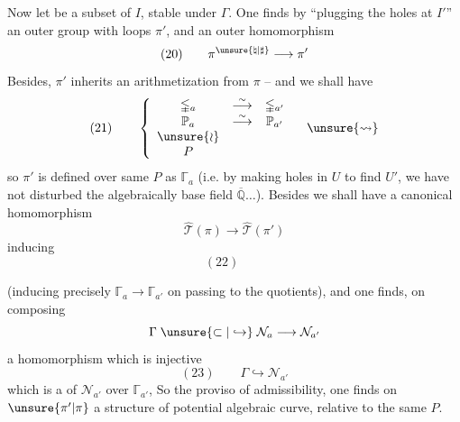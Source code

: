 Now let
be a
subset of $I$, stable under $\Gamma$. One finds
by ``plugging the holes at $I'$'' an
outer group with loops $\pi'$,  and an
outer homomorphism
\[
(20)\qquad \pi^{\unsure{\natural|\sharp}}\longrightarrow\pi'
\]
Besides, $\pi'$ inherits an arithmetization 
from $\pi$ -- and we shall have
\[
(21)\qquad
\left\{
\begin{array}{ccc}
\mathbb{\Gamma}_a & \overset{\sim}{\longrightarrow} & \mathbb{\Gamma}_{a'} \\
\mathbb P_a & \overset{\sim}{\longrightarrow} & \mathbb P_{a'} \\
\unsure{\wr} & & \\
P & &
\end{array}
\right.
\quad\unsure{\leadsto}
\]
so $\pi'$ is defined over  same $P$ as
$\mathbb{\Gamma}_a$
(i.e. by making holes in $U$ to
find $U'$, we have not disturbed the
algebraically  base field $\overline{\mathbb Q}\ldots$). Besides
we shall have a canonical homomorphism
\[
\widehat{\mathcal T}(\pi)\longrightarrow
\widehat{\mathcal T}(\pi')
\]
inducing
\[
(22)\qquad
\]



(inducing precisely $\mathbb{\Gamma}_a\longrightarrow\mathbb{\Gamma}_{a'}$ on passing
to the quotients), and one finds, on
composing
\[
\Gamma\;\unsure{\subset|\hookrightarrow}\;\mathcal N_a\longrightarrow\mathcal N_{a'}
\]
a homomorphism which is  injective
\[
(23)\qquad\Gamma\hookrightarrow\mathcal N_{a'}
\]
which is a  of $\mathcal N_{a'}$ over $\mathbb{\Gamma}_{a'}$,
So  the proviso of admissibility,
one finds on  $\unsure{\pi'|\pi}$ a structure
of potential algebraic curve, relative
to the same $P$.

